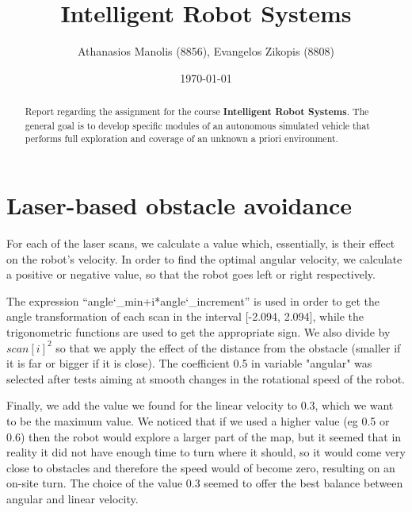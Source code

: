 \documentclass[letterpaper,12pt]{article}
\begin{document}
\title{Intelligent Robot Systems}
\author{Athanasios Manolis (8856), Evangelos Zikopis (8808)}
\date{\today}
\maketitle

\newpage

\begin{abstract}
Report regarding the assignment for the course \textbf{Intelligent Robot Systems}. The general goal is to develop specific modules of an autonomous simulated vehicle that performs full exploration and coverage of an unknown a priori environment.
\end{abstract}

\section{Laser-based obstacle avoidance}


\vspace{2mm} %

For each of the laser scans, we calculate a value which, essentially, is their effect on the robot's velocity. In order to find the optimal angular velocity, we calculate a positive or negative value, so that the robot goes left or right respectively.

The expression “angle\char`_min+i*angle\char`_increment” is used in order to get the angle transformation of each scan in the interval [-2.094, 2.094], while the trigonometric functions are used to get the appropriate sign. We also divide by $scan[i]^2$ so that we apply the effect of the distance from the obstacle (smaller if it is far or bigger if it is close). The coefficient 0.5 in variable "angular" was selected after tests aiming at smooth changes in the rotational speed of the robot.

Finally, we add the value we found for the linear velocity to 0.3, which we want to be the maximum value. We noticed that if we used a higher value (eg 0.5 or 0.6) then the robot would explore a larger part of the map, but it seemed that in reality it did not have enough time to turn where it should, so it would come very close to obstacles and therefore the speed would of become zero, resulting on an on-site turn. The choice of the value 0.3 seemed to offer the best balance between angular and linear velocity.

\newpage
\end{document}
